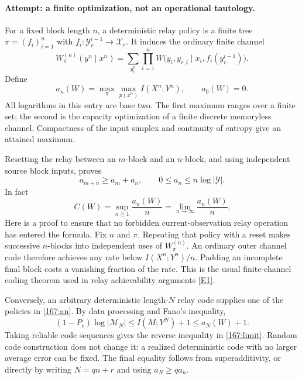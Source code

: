 \documentclass[11pt,a4paper]{article}
\newcommand{\eref}[2]{\hyperlink{extra:#1:#2}{[E#2]}}
\numberwithin{equation}{section}
\begin{document}
\paragraph{Attempt: a finite optimization, not an operational tautology.}
For a fixed block length $n$, a deterministic relay policy is a finite
tree $\pi=(f_i)_{i=1}^n$ with
$f_i:\mathcal Y_r^{i-1}\to\mathcal X_r$. It induces the ordinary finite
channel
\begin{equation}
 W_\pi^{(n)}(y^n\mid x^n)
 =\sum_{y_r^n}\prod_{i=1}^n
 W\bigl(y_i,y_{r,i}\mid x_i,f_i(y_r^{i-1})\bigr).
\end{equation}
Define
\begin{equation}\label{167:an}
 a_n(W)=\max_{\pi}\max_{p(x^n)}I(X^n;Y^n),\qquad a_0(W)=0.
\end{equation}
All logarithms in this entry are base two. The first maximum ranges
over a finite set; the second is the capacity optimization of a finite
discrete memoryless channel. Compactness of the input simplex and
continuity of entropy give an attained maximum.

Resetting the relay between an $m$-block and an $n$-block, and using
independent source block inputs, proves
\begin{equation}
 a_{m+n}\geq a_m+a_n,\qquad 0\leq a_n\leq n\log|\mathcal Y|.
\end{equation}
In fact
\begin{equation}\label{167:limit}
 C(W)=\sup_{n\geq1}\frac{a_n(W)}n
     =\lim_{n\to\infty}\frac{a_n(W)}n.
\end{equation}
Here is a proof to ensure that no forbidden current-observation relay
operation has entered the formula. Fix $n$ and $\pi$. Repeating that
policy with a reset makes successive $n$-blocks into independent uses
of $W_\pi^{(n)}$. An ordinary outer channel code therefore achieves
any rate below $I(X^n;Y^n)/n$. Padding an incomplete final block costs
a vanishing fraction of the rate. This is the usual finite-channel
coding theorem used in relay achievability arguments
\eref{167}{1}.

Conversely, an arbitrary deterministic length-$N$ relay code supplies
one of the policies in \eqref{167:an}. By data processing and Fano's
inequality,
\begin{equation}
 (1-P_e)\log|\mathcal M_N|\leq I(M;Y^N)+1
 \leq a_N(W)+1.
\end{equation}
Taking reliable code sequences gives the reverse inequality in
\eqref{167:limit}. Random code construction does not change it: a
realized deterministic code with no larger average error can be fixed.
The final equality follows from superadditivity, or directly by
writing $N=qn+r$ and using $a_N\geq q a_n$.
\end{document}
